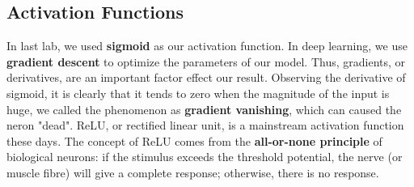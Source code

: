 \documentclass[12pt,a4paper]{article}
\begin{document}
\subsection{Activation Functions}
In last lab, we used \textbf{sigmoid} as our activation function. In deep learning, we use \textbf{gradient descent} to optimize the parameters of our model. Thus, gradients, or derivatives, are an important factor effect our result. Observing the derivative of sigmoid, it is clearly that it tends to zero when the magnitude of the input is huge, we called the phenomenon as \textbf{gradient vanishing}, which can caused the neron "dead". ReLU, or rectified linear unit, is a mainstream activation function these days. The concept of ReLU comes from the \textbf{all-or-none principle} of biological neurons: if the stimulus exceeds the threshold potential, the nerve (or muscle fibre) will give a complete response; otherwise, there is no response. 
\end{document}
